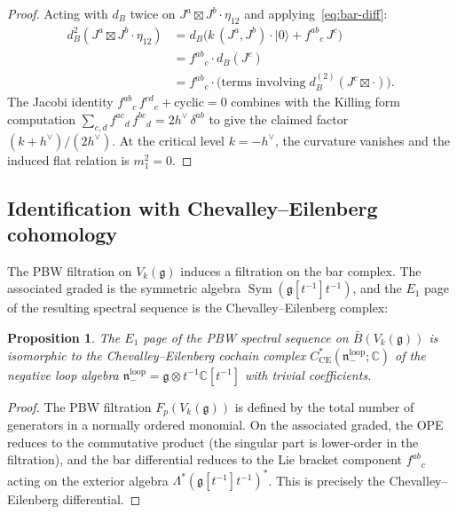 \documentclass[11pt]{article}
\theoremstyle{plain}
\newtheorem{proposition}[theorem]{Proposition}
\theoremstyle{definition}
\theoremstyle{remark}
\newcommand{\fg}{\mathfrak{g}}
\newcommand{\fn}{\mathfrak{n}}
\newcommand{\barB}{\bar{B}}
\newcommand{\CE}{\mathrm{CE}}
\DeclareMathOperator{\Sym}{Sym}
\numberwithin{equation}{section}
\begin{document}
\begin{proof}
Acting with $d_B$ twice on $J^a \boxtimes J^b \cdot \eta_{12}$
and applying~\eqref{eq:bar-diff}:
\begin{align*}
d_B^2(J^a \boxtimes J^b \cdot \eta_{12})
&= d_B\bigl(k\,(J^a, J^b) \cdot |0\rangle
+ f^{ab}{}_c\, J^c\bigr) \\
&= f^{ab}{}_c \cdot d_B(J^c) \\
&= f^{ab}{}_c \cdot \bigl(\text{terms involving}
\; d_B^{(2)}(J^c \boxtimes \cdot)\bigr).
\end{align*}
The Jacobi identity
$f^{ab}{}_c\, f^{cd}{}_e + \text{cyclic} = 0$
combines with the Killing form computation
$\sum_{c,d} f^{ac}{}_d\, f^{bc}{}_d = 2h^\vee\,\delta^{ab}$
to give the claimed factor $(k + h^\vee)/(2h^\vee)$.
At the critical level $k = -h^\vee$, the curvature vanishes
and the induced flat relation is $m_1^2=0$.
\end{proof}

\subsection{Identification with Chevalley--Eilenberg cohomology}

The PBW filtration on $V_k(\fg)$ induces a filtration
on the bar complex. The associated graded is the
symmetric algebra $\Sym(\fg[t^{-1}]t^{-1})$, and the
$E_1$ page of the resulting spectral sequence is the
Chevalley--Eilenberg complex:

\begin{proposition}\label{prop:pbw-e1}
The $E_1$ page of the PBW spectral sequence on
$\barB(V_k(\fg))$ is isomorphic to the
Chevalley--Eilenberg cochain complex
$C^*_{\CE}(\fn_-^{\mathrm{loop}}; \mathbb{C})$
of the negative loop algebra
$\fn_-^{\mathrm{loop}} = \fg \otimes t^{-1}\mathbb{C}[t^{-1}]$
with trivial coefficients.
\end{proposition}

\begin{proof}
The PBW filtration $F_p(V_k(\fg))$ is defined by the
total number of generators in a normally ordered monomial.
On the associated graded, the OPE reduces to the
commutative product (the singular part is lower-order in
the filtration), and the bar differential reduces to
the Lie bracket component $f^{ab}{}_c$ acting on the
exterior algebra $\Lambda^*(\fg[t^{-1}]t^{-1})^*$.
This is precisely the Chevalley--Eilenberg differential.
\end{proof}

\end{document}
